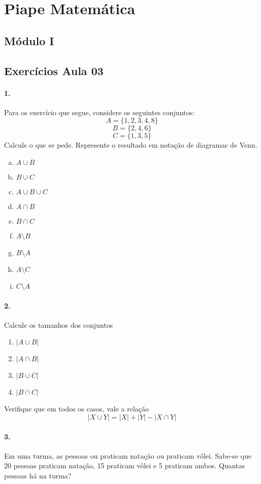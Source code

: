 \documentclass[a4paper,twocolumn,12pt]{article}
\begin{document}
 
\section*{Piape Matemática} 
 
\subsection*{Módulo I}\label{muxf3dulo-i}
 
\subsection*{Exercícios Aula 03}\label{exercuxedcios-aula-03}

\paragraph{1.} Para os exercício que segue, considere os seguintes conjuntos:
\[ A = \{1,2,3,4,8\}\] \[ B =  \{2,4,6\}\] \[ C = \{1,3,5\}\]
Calcule o que se pede. Represente o resultado em notação de diagramas de Venn.
\begin{enumerate}[a)]
\item
  \(A\cup B\)
\item
  \(B\cup C\)
\item
  \(A\cup B \cup C\)
\item
  \(A\cap B\)
\item
  \(B\cap C\)
\item
  \(A\setminus B\)
\item
  \(B\setminus A\)
\item
  \(A\setminus C\)
\item
  \(C\setminus A\)
\end{enumerate}

\paragraph{2.} Calcule os tamanhos dos conjuntos
\begin{enumerate}
  \item \(|A\cup B|\)
  \item \(|A\cap B|\)
  \item \(|B\cup C|\)
  \item \(|B\cap C|\)
\end{enumerate}

Verifique que em todos os casos, vale a relação
\[|X\cup Y| = |X| + |Y| - |X\cap Y|\]


\paragraph{3.} Em uma turma, as pessoas ou praticam natação ou praticam vôlei. Sabe-se que 20 pessoas praticam natação, 15 praticam vôlei e 5 praticam ambos. Quantas pessoas há na turma?
\end{document}
